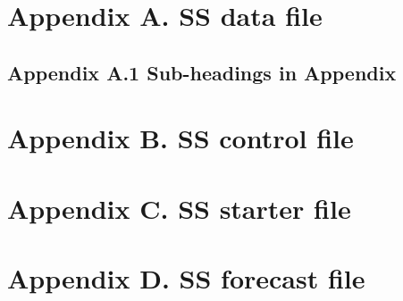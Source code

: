 \documentclass[12pt,]{article}
\begin{document}
\section{Appendix A. SS data file}\label{appendix-a.-ss-data-file}

\subsection{Appendix A.1 Sub-headings in
Appendix}\label{appendix-a.1-sub-headings-in-appendix}

\section{Appendix B. SS control file}\label{appendix-b.-ss-control-file}

\section{Appendix C. SS starter file}\label{appendix-c.-ss-starter-file}

\section{Appendix D. SS forecast
file}\label{appendix-d.-ss-forecast-file}
\end{document}
